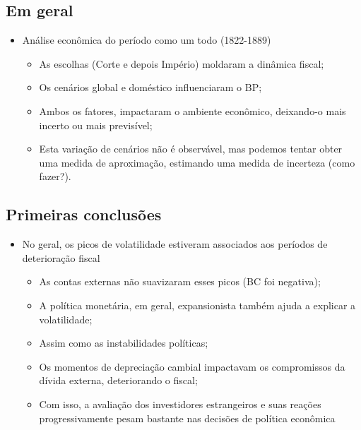 \documentclass[a4paper,12pt]{article}[abntex2]
\begin{document}
\subsection{\textbf{Em geral}}
\begin{itemize}
    \item Análise econômica do período como um todo (1822-1889)
    \begin{itemize}
        \item As escolhas (Corte e depois Império) moldaram a dinâmica fiscal;
    \end{itemize}
    \begin{itemize}
        \item Os cenários global e doméstico influenciaram o BP;
    \end{itemize}
    \begin{itemize}
        \item  Ambos os fatores, impactaram o ambiente econômico, deixando-o mais incerto ou mais previsível;
    \end{itemize}
\begin{itemize}
    \item Esta variação de cenários não é observável, mas podemos tentar obter uma medida de aproximação, estimando uma medida de incerteza (como fazer?).
\end{itemize}
\end{itemize}
\subsection{\textbf{Primeiras conclusões}}
\begin{itemize}
    \item No geral, os picos de volatilidade estiveram associados aos períodos
de deterioração fiscal
\begin{itemize}
    \item  As contas externas não suavizaram esses picos (BC foi negativa);
\end{itemize}
\begin{itemize}
    \item A política monetária, em geral, expansionista também ajuda a explicar a volatilidade;
\end{itemize}
\begin{itemize}
    \item  Assim como as instabilidades políticas;
\end{itemize}
\begin{itemize}
    \item Os momentos de depreciação cambial impactavam os compromissos da dívida externa, deteriorando o fiscal;
\end{itemize}
\begin{itemize}
    \item Com isso, a avaliação dos investidores estrangeiros e suas reações progressivamente pesam bastante nas decisões de política econômica
\end{itemize}
\end{itemize}
\end{document}
